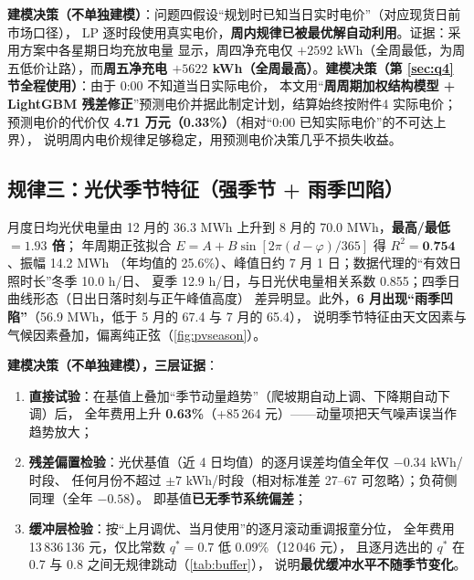 \textbf{建模决策（不单独建模\nobreak）}\nobreak：问题四假设“规划时已知当日实时电价\nobreak”（对应现货日前市场口径\nobreak）\nobreak，
LP 逐时段使用真实电价\nobreak，\textbf{周内规律已被最优解自动利用}\nobreak。证据\nobreak：采用方案中各星期日均充放电量
显示\nobreak，周四净充电仅 $+2592$ kWh（全周最低\nobreak，为周五低价让路\nobreak）\nobreak，而\textbf{周五净充电
$+5622$ kWh（全周最高\nobreak）}\nobreak。\textbf{建模决策（第 \ref{sec:q4} 节全程使用）}\nobreak：由于 0:00 不知道当日实际电价\nobreak，
本文用“\textbf{周周期加权结构模型 + LightGBM 残差修正\nobreak}”预测电价并据此制定计划\nobreak，结算始终按附件4 实际电价\nobreak；
预测电价的代价仅 \textbf{4.71 万元（0.33\%\nobreak）}（相对“0:00 已知实际电价\nobreak”的不可达上界）\nobreak，
说明周内电价规律足够稳定\nobreak，用预测电价决策几乎不损失收益\nobreak。

\subsection{规律三\nobreak：光伏季节特征（强季节 + 雨季凹陷\nobreak）}

月度日均光伏电量由 12 月的 36.3 MWh 上升到 8 月的 70.0 MWh\nobreak，\textbf{最高/最低 $=1.93$ 倍}\nobreak；
年周期正弦拟合 $E=A+B\sin[2\pi(d-\varphi)/365]$ 得 $R^2=\textbf{0.754}$\nobreak、振幅 14.2 MWh
（年均值的 25.6\%\nobreak）\nobreak、峰值日约 7 月 1 日\nobreak；数据代理的“有效日照时长\nobreak”冬季 10.0 h/日\nobreak、
夏季 12.9 h/日\nobreak，与日光伏电量相关系数 0.855\nobreak；四季日曲线形态（日出日落时刻与正午峰值高度\nobreak）
差异明显\nobreak。此外\nobreak，\textbf{6 月出现“雨季凹陷\nobreak”}（56.9 MWh\nobreak，低于 5 月的 67.4 与 7 月的 65.4\nobreak）\nobreak，
说明季节特征由天文因素与气候因素叠加\nobreak，偏离纯正弦（\cref{fig:pvseason}\nobreak）\nobreak。

\textbf{建模决策（不单独建模\nobreak）\nobreak，三层证据}\nobreak：
\begin{enumerate}[label=(\arabic*), leftmargin=2.2em, itemsep=1pt]
\item \textbf{直接试验}\nobreak：在基值上叠加“季节动量趋势\nobreak”（爬坡期自动上调\nobreak、下降期自动下调\nobreak）后\nobreak，
全年费用上升 \textbf{0.63\%}（+85\,264 元\nobreak）——动量项把天气噪声误当作趋势放大\nobreak；
\item \textbf{残差偏置检验}\nobreak：光伏基值（近 4 日均值\nobreak）的逐月误差均值全年仅 $-0.34$ kWh/时段\nobreak、
任何月份不超过 $\pm7$ kWh/时段（相对标准差 27--67 可忽略\nobreak）\nobreak；负荷侧同理（全年 $-0.58$\nobreak）\nobreak。
即基值\textbf{已无季节系统偏差}\nobreak；
\item \textbf{缓冲层检验}\nobreak：按“上月调优\nobreak、当月使用\nobreak”的逐月滚动重调报童分位\nobreak，
全年费用 13\,836\,136 元\nobreak，仅比常数 $q^*=0.7$ 低 0.09\%（12\,046 元\nobreak）\nobreak，
且逐月选出的 $q^*$ 在 0.7 与 0.8 之间无规律跳动（\cref{tab:buffer}\nobreak）\nobreak，
说明\textbf{最优缓冲水平不随季节变化}\nobreak。
\end{enumerate}

